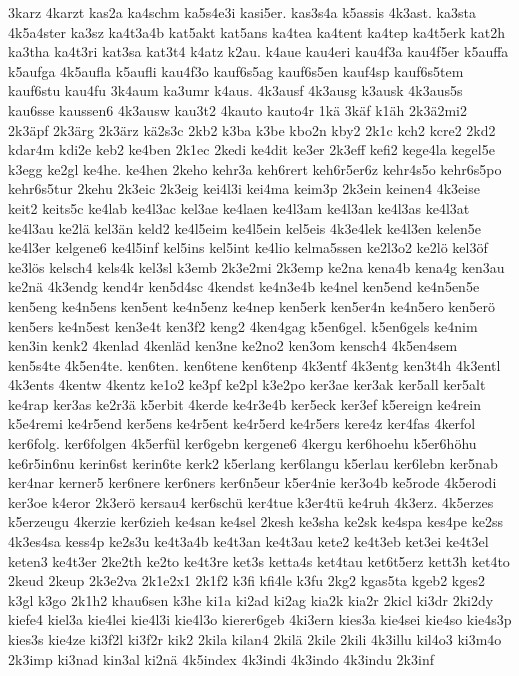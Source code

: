 {3karz
4karzt
kas2a
ka4schm
ka5s4e3i
kasi5er.
kas3s4a
k5assis
4k3ast.
ka3sta
4k5a4ster
ka3sz
ka4t3a4b
kat5akt
kat5ans
ka4tea
ka4tent
ka4tep
ka4t5erk
kat2h
ka3tha
ka4t3ri
kat3sa
kat3t4
k4atz
k2au.
k4aue
kau4eri
kau4f3a
kau4f5er
k5auffa
k5aufga
4k5aufla
k5aufli
kau4f3o
kauf6s5ag
kauf6s5en
kauf4sp
kauf6s5tem
kauf6stu
kau4fu
3k4aum
ka3umr
k4aus.
4k3ausf
4k3ausg
k3ausk
4k3aus5s
kau6sse
kaussen6
4k3ausw
kau3t2
4kauto
kauto4r
1kä
3käf
k1äh
2k3ä2mi2
2k3äpf
2k3ärg
2k3ärz
kä2s3c
2kb2
k3ba
k3be
kbo2n
kby2
2k1c
kch2
kcre2
2kd2
kdar4m
kdi2e
keb2
ke4ben
2k1ec
2kedi
ke4dit
ke3er
2k3eff
kefi2
kege4la
kegel5e
k3egg
ke2gl
ke4he.
ke4hen
2keho
kehr3a
keh6rert
keh6r5er6z
kehr4s5o
kehr6s5po
kehr6s5tur
2kehu
2k3eic
2k3eig
kei4l3i
kei4ma
keim3p
2k3ein
keinen4
4k3eise
keit2
keits5c
ke4lab
ke4l3ac
kel3ae
ke4laen
ke4l3am
ke4l3an
ke4l3as
ke4l3at
ke4l3au
ke2lä
kel3än
keld2
ke4l5eim
ke4l5ein
kel5eis
4k3e4lek
ke4l3en
kelen5e
ke4l3er
kelgene6
ke4l5inf
kel5ins
kel5int
ke4lio
kelma5ssen
ke2l3o2
ke2lö
kel3öf
ke3lös
kelsch4
kels4k
kel3sl
k3emb
2k3e2mi
2k3emp
ke2na
kena4b
kena4g
ken3au
ke2nä
4k3endg
kend4r
ken5d4sc
4kendst
ke4n3e4b
ke4nel
ken5end
ke4n5en5e
ken5eng
ke4n5ens
ken5ent
ke4n5enz
ke4nep
ken5erk
ken5er4n
ke4n5ero
ken5erö
ken5ers
ke4n5est
ken3e4t
ken3f2
keng2
4ken4gag
k5en6gel.
k5en6gels
ke4nim
ken3in
kenk2
4kenlad
4kenläd
ken3ne
ke2no2
ken3om
kensch4
4k5en4sem
ken5s4te
4k5en4te.
ken6ten.
ken6tene
ken6tenp
4k3entf
4k3entg
ken3t4h
4k3entl
4k3ents
4kentw
4kentz
ke1o2
ke3pf
ke2pl
k3e2po
ker3ae
ker3ak
ker5all
ker5alt
ke4rap
ker3as
ke2r3ä
k5erbit
4kerde
ke4r3e4b
ker5eck
ker3ef
k5ereign
ke4rein
k5e4remi
ke4r5end
ker5ens
ke4r5ent
ke4r5erd
ke4r5ers
kere4z
ker4fas
4kerfol
ker6folg.
ker6folgen
4k5erfül
ker6gebn
kergene6
4kergu
ker6hoehu
k5er6höhu
ke6r5in6nu
kerin6st
kerin6te
kerk2
k5erlang
ker6langu
k5erlau
ker6lebn
ker5nab
ker4nar
kerner5
ker6nere
ker6ners
ker6n5eur
k5er4nie
ker3o4b
ke5rode
4k5erodi
ker3oe
k4eror
2k3erö
kersau4
ker6schü
ker4tue
k3er4tü
ke4ruh
4k3erz.
4k5erzes
k5erzeugu
4kerzie
ker6zieh
ke4san
ke4sel
2kesh
ke3sha
ke2sk
ke4spa
kes4pe
ke2ss
4k3es4sa
kess4p
ke2s3u
ke4t3a4b
ke4t3an
ke4t3au
kete2
ke4t3eb
ket3ei
ke4t3el
keten3
ke4t3er
2ke2th
ke2to
ke4t3re
ket3s
ketta4s
ket4tau
ket6t5erz
kett3h
ket4to
2keud
2keup
2k3e2va
2k1e2x1
2k1f2
k3fi
kfi4le
k3fu
2kg2
kgas5ta
kgeb2
kges2
k3gl
k3go
2k1h2
khau6sen
k3he
ki1a
ki2ad
ki2ag
kia2k
kia2r
2kicl
ki3dr
2ki2dy
kiefe4
kiel3a
kie4lei
kie4l3i
kie4l3o
kierer6geb
4ki3ern
kies3a
kie4sei
kie4so
kie4s3p
kies3s
kie4ze
ki3f2l
ki3f2r
kik2
2kila
kilan4
2kilä
2kile
2kili
4k3illu
kil4o3
ki3m4o
2k3imp
ki3nad
kin3al
ki2nä
4k5index
4k3indi
4k3indo
4k3indu
2k3inf
}
